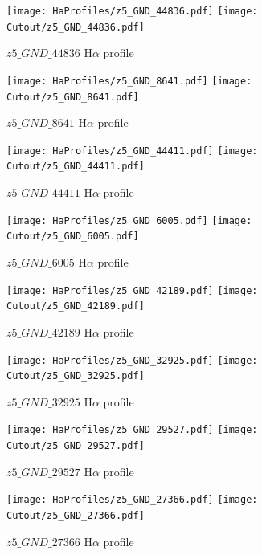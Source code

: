 \documentclass[12pt,english]{article}
\begin{document}
\clearpage
\begin{figure}
\begin{center}\texttt{[image: HaProfiles/z5\_GND\_44836.pdf]}
\texttt{[image: Cutout/z5\_GND\_44836.pdf]}
\caption{$z5\_GND\_44836$ H$\alpha$ profile}
\end{center}
\end{figure}
\clearpage
\begin{figure}
\begin{center}\texttt{[image: HaProfiles/z5\_GND\_8641.pdf]}
\texttt{[image: Cutout/z5\_GND\_8641.pdf]}
\caption{$z5\_GND\_8641$ H$\alpha$ profile}
\end{center}
\end{figure}
\clearpage
\begin{figure}
\begin{center}\texttt{[image: HaProfiles/z5\_GND\_44411.pdf]}
\texttt{[image: Cutout/z5\_GND\_44411.pdf]}
\caption{$z5\_GND\_44411$ H$\alpha$ profile}
\end{center}
\end{figure}
\clearpage
\begin{figure}
\begin{center}\texttt{[image: HaProfiles/z5\_GND\_6005.pdf]}
\texttt{[image: Cutout/z5\_GND\_6005.pdf]}
\caption{$z5\_GND\_6005$ H$\alpha$ profile}
\end{center}
\end{figure}
\clearpage
\begin{figure}
\begin{center}\texttt{[image: HaProfiles/z5\_GND\_42189.pdf]}
\texttt{[image: Cutout/z5\_GND\_42189.pdf]}
\caption{$z5\_GND\_42189$ H$\alpha$ profile}
\end{center}
\end{figure}
\clearpage
\begin{figure}
\begin{center}\texttt{[image: HaProfiles/z5\_GND\_32925.pdf]}
\texttt{[image: Cutout/z5\_GND\_32925.pdf]}
\caption{$z5\_GND\_32925$ H$\alpha$ profile}
\end{center}
\end{figure}
\clearpage
\begin{figure}
\begin{center}\texttt{[image: HaProfiles/z5\_GND\_29527.pdf]}
\texttt{[image: Cutout/z5\_GND\_29527.pdf]}
\caption{$z5\_GND\_29527$ H$\alpha$ profile}
\end{center}
\end{figure}
\clearpage
\begin{figure}
\begin{center}\texttt{[image: HaProfiles/z5\_GND\_27366.pdf]}
\texttt{[image: Cutout/z5\_GND\_27366.pdf]}
\caption{$z5\_GND\_27366$ H$\alpha$ profile}
\end{center}
\end{figure}
\end{document}
